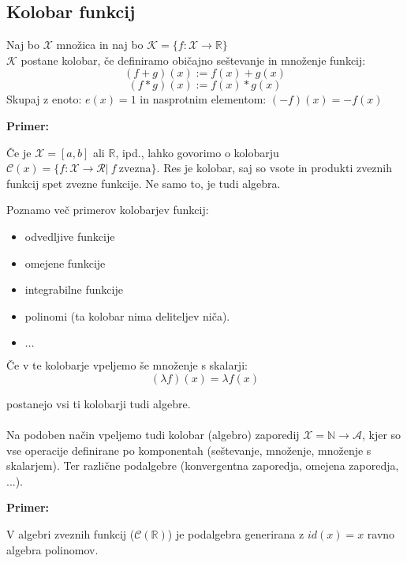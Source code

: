 \documentclass[a4paper]{article}
\newcounter{environment:definition_counter}
\newcounter{environment:theorem_counter}
\newcounter{environment:statement_counter}
\newcounter{example:example_counter}
\newenvironment{example}
{\textbf{Primer:}\\}
{\setcounter{example:example_counter}{0}}
\newenvironment{example_case}
{\refstepcounter{example:example_counter} \arabic{example:example_counter}.}
{\\}
\begin{document}
\subsection{Kolobar funkcij}

Naj bo $\mathcal{X}$ množica in naj bo $\mathcal{K} = \{ f : \mathcal{X} \to \mathbb{R}\}$\\

$\mathcal{K}$ postane kolobar, če definiramo običajno seštevanje in množenje funkcij:
$$(f+g)(x) := f(x) + g(x) $$
$$(f*g)(x) := f(x) * g(x) $$
Skupaj z enoto: $e(x) = 1$ in nasprotnim elementom: $(-f)(x) = -f(x)$ 

\begin{example}
\begin{example_case}
Če je $\mathcal{X} = [a,b]$ ali $\mathbb{R}$, ipd., lahko govorimo o kolobarju $\mathcal{C}(x) = \{f: \mathcal{X} \to \mathcal{R} | \ f \ \text{zvezna} \}$. Res je kolobar, saj so vsote in produkti zveznih funkcij spet zvezne funkcije. Ne samo to, je tudi algebra.
\end{example_case}
\end{example}

Poznamo več primerov kolobarjev funkcij:
\begin{itemize}
\item odvedljive funkcije
\item omejene funkcije 
\item integrabilne funkcije 
\item polinomi (ta kolobar nima deliteljev niča).
\item $\dots$
\end{itemize}

Če v te kolobarje vpeljemo še množenje s skalarji:
\begin{equation}
\label{eq:def_scala_multiplication_functions}
(\lambda f) (x) = \lambda f(x)
\end{equation}

postanejo vsi ti kolobarji tudi algebre.
\\
\\
Na podoben način vpeljemo tudi kolobar (algebro) zaporedij $\mathcal{X} = \mathbb{N} \to \mathcal{A}$, kjer so vse operacije definirane po komponentah (seštevanje, množenje, množenje s skalarjem). Ter različne podalgebre (konvergentna zaporedja, omejena zaporedja, ...).

\begin{example}
\begin{example_case}
V algebri zveznih funkcij ($\mathcal{C}(\mathbb{R})$) je podalgebra generirana z $id(x) = x$ ravno algebra polinomov.
\end{example_case}
\end{example}
\end{document}
